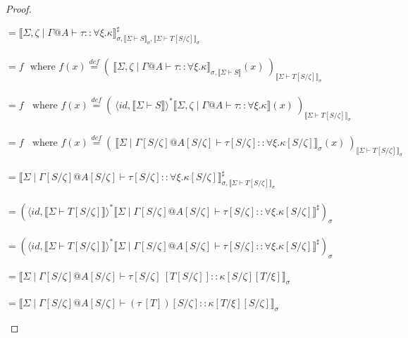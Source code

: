 \documentclass{article}
\newcommand{\sem}[1]{\llbracket #1 \rrbracket}
\newcommand{\defeq}{\overset{\mathit{def}}{=}}
\begin{document}
\begin{proof}
\begin{description}
$= \sem{\Sigma,\zeta \mid \Gamma @ A \vdash \tau :: \forall \xi. \kappa}^\sharp_{\sigma, \sem{\Sigma \vdash S}_\sigma, \sem{\Sigma \vdash T[S/\zeta]}_\sigma}$\\~\\
$= f~~~\text{where } f(x) \defeq (~\sem{\Sigma,\zeta \mid \Gamma @ A \vdash \tau :: \forall \xi. \kappa}_{\sigma, \sem{\Sigma \vdash S}}(x)~)_{\sem{\Sigma \vdash T[S/\zeta]}_\sigma}$\\~\\
$= f~~~~\text{where } f(x) \defeq (~\langle \mathit{id}, \sem{\Sigma \vdash S} \rangle^* \sem{\Sigma,\zeta \mid \Gamma @ A \vdash \tau :: \forall \xi. \kappa}(x)~)_{\sem{\Sigma \vdash T[S/\zeta]}_\sigma}$\\~\\
$= f~~~~\text{where } f(x) \defeq (~\sem{\Sigma \mid \Gamma[S/\zeta] @ A[S/\zeta] \vdash \tau[S/\zeta] :: \forall \xi. \kappa[S/\zeta]}_\sigma(x)~)_{\sem{\Sigma \vdash T[S/\zeta]}_\sigma}$\\~\\
$= \sem{\Sigma \mid \Gamma[S/\zeta] @ A[S/\zeta] \vdash \tau[S/\zeta] :: \forall \xi. \kappa[S/\zeta]}^\sharp_{\sigma,\sem{\Sigma \vdash T[S/\zeta]}_\sigma}$\\~\\
$= (\langle \mathit{id}, \sem{\Sigma \vdash T[S/\zeta]} \rangle^* \sem{\Sigma \mid \Gamma[S/\zeta] @ A[S/\zeta] \vdash \tau[S/\zeta] :: \forall \xi. \kappa[S/\zeta]}^\sharp)_\sigma$\\~\\
$= (\langle \mathit{id}, \sem{\Sigma \vdash T[S/\zeta]} \rangle^* \sem{\Sigma \mid \Gamma[S/\zeta] @ A[S/\zeta] \vdash \tau[S/\zeta] :: \forall \xi. \kappa[S/\zeta]}^\sharp)_\sigma$\\~\\
$= \sem{\Sigma \mid \Gamma[S/\zeta] @ A[S/\zeta] \vdash \tau[S/\zeta]~[T[S/\zeta]] :: \kappa[S/\zeta][T/\xi]}_\sigma$\\~\\
$= \sem{\Sigma \mid \Gamma[S/\zeta] @ A[S/\zeta] \vdash (\tau~[T])[S/\zeta] :: \kappa[T/\xi][S/\zeta]}_\sigma$



\end{description}
\end{proof}
\end{document}
